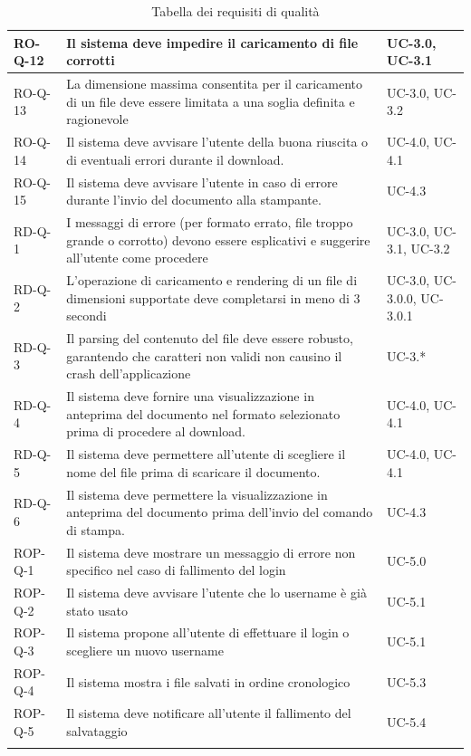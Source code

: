 \documentclass[11pt,a4paper]{article}
\begin{document}
\begin{longtable}{|p{}|>{\raggedright\arraybackslash}p{}|p{}|}
\hline
RO-Q-12 & Il sistema deve impedire il caricamento di file corrotti & UC-3.0, UC-3.1\\
\hline
RO-Q-13 & La dimensione massima consentita per il caricamento di un file deve essere limitata a una soglia definita e ragionevole & UC-3.0, UC-3.2 \\
\hline
RO-Q-14 & Il sistema deve avvisare l'utente della buona riuscita o di eventuali errori durante il download. & UC-4.0, UC-4.1 \\
\hline
RO-Q-15 & Il sistema deve avvisare l’utente in caso di errore durante l’invio del documento alla stampante. & UC-4.3 \\
\hline
RD-Q-1 & I messaggi di errore (per formato errato, file troppo grande o corrotto) devono essere esplicativi e suggerire all'utente come procedere & UC-3.0, UC-3.1, UC-3.2 \\
\hline
RD-Q-2 & L'operazione di caricamento e rendering di un file di dimensioni supportate deve completarsi in meno di 3 secondi & UC-3.0, UC-3.0.0, UC-3.0.1 \\
\hline
RD-Q-3 & Il parsing del contenuto del file deve essere robusto, garantendo che caratteri non validi non causino il crash dell'applicazione & UC-3.* \\
\hline
RD-Q-4 & Il sistema deve fornire una visualizzazione in anteprima del documento nel formato selezionato prima di procedere al download. & UC-4.0, UC-4.1 \\
\hline
RD-Q-5 & Il sistema deve permettere all'utente di scegliere il nome del file prima di scaricare il documento. & UC-4.0, UC-4.1 \\
\hline
RD-Q-6 & Il sistema deve permettere la visualizzazione in anteprima del documento prima dell'invio del comando di stampa. & UC-4.3 \\
\hline
ROP-Q-1 & Il sistema deve mostrare un messaggio di errore non specifico nel caso di fallimento del login & UC-5.0 \\
\hline
ROP-Q-2 & Il sistema deve avvisare l'utente che lo username è già stato usato & UC-5.1 \\
\hline
ROP-Q-3 & Il sistema propone all'utente di effettuare il login o scegliere un nuovo username & UC-5.1 \\
\hline
ROP-Q-4 & Il sistema mostra i file salvati in ordine cronologico & UC-5.3 \\
\hline
ROP-Q-5 & Il sistema deve notificare all'utente il fallimento del salvataggio & UC-5.4 \\
\hline
\addlinespace[1em]
\caption{Tabella dei requisiti di qualità}
\end{longtable}
\end{document}
